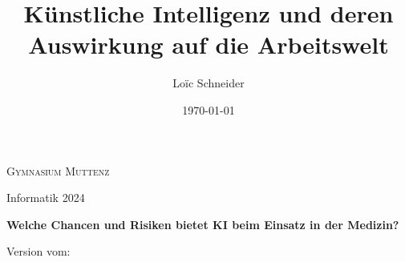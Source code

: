 \documentclass{report}
\title{Künstliche Intelligenz und deren Auswirkung auf die Arbeitswelt}
\author{Loïc Schneider}
\date{\today}
\begin{document}
\begin{titlepage}
    \makeatletter %
	\begin{center}
		{\scshape Gymnasium Muttenz} \vspace{0.5cm}

		 Informatik 2024\vspace{5.5cm}

		{\huge\bfseries \@title} 

        \vspace{1cm}

        {\Large\bfseries Welche Chancen und Risiken bietet KI beim Einsatz in der Medizin?}

        \vspace{2cm}

		\vspace{2cm}

		{\Large\itshape \@author}

        \vspace{2cm}

        Version vom: \@date
	\end{center}
    
    \makeatother %
\end{titlepage}

\tableofcontents












\nocite{*}

\printbibliography
\end{document}
